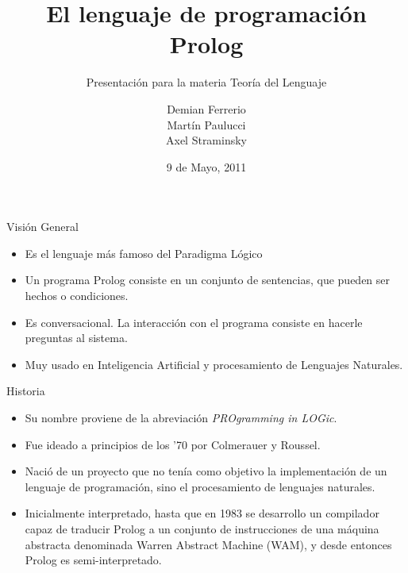 \documentclass[xcolor=dvipsnames]{beamer}
\title{El lenguaje de programación Prolog}
\subtitle{Presentación para la materia Teoría del Lenguaje}
\author{
Demian Ferrerio \\
Martín Paulucci \\
Axel Straminsky}
\institute[UMBC]{
  Facultad de Ingeniería\\
  Universidad de Buenos Aires \\
}
\date{9 de Mayo, 2011}
\begin{document}
\begin{frame}[plain]
  \titlepage
\end{frame}

\begin{frame}{Visión General}

\begin{itemize}
\item Es el lenguaje más famoso del Paradigma Lógico
\item Un programa Prolog consiste en un conjunto de sentencias, que pueden ser hechos o condiciones.
\item Es conversacional. La interacción con el programa consiste en hacerle preguntas al sistema.
\item Muy usado en Inteligencia Artificial y procesamiento de Lenguajes Naturales.
\end{itemize}

\end{frame}


\begin{frame}{Historia}

\begin{itemize}
\item Su nombre proviene de la abreviación \textit{PROgramming in LOGic}.
\item Fue ideado a principios de los '70 por Colmerauer y Roussel.
\item Nació de un proyecto que no tenía como objetivo la implementación de un lenguaje de programación, sino el procesamiento de lenguajes naturales.
\item Inicialmente interpretado,  hasta que en 1983 se desarrollo un compilador capaz de traducir Prolog a un conjunto de instrucciones de una máquina abstracta denominada Warren Abstract Machine (WAM), y desde entonces Prolog es semi-interpretado.
\end{itemize}

\end{frame}
\end{document}
